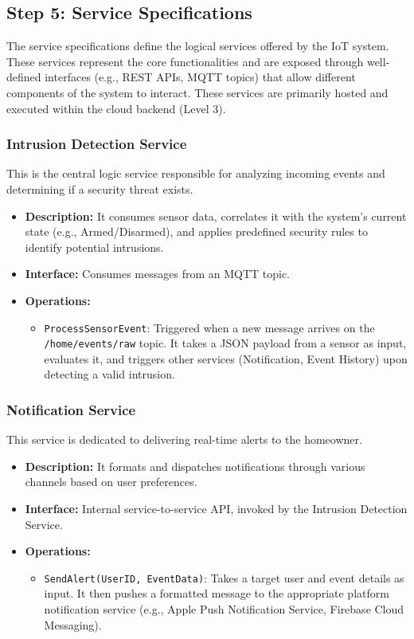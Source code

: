 \documentclass[conference]{IEEEtran}
\begin{document}
\subsection{Step 5: Service Specifications}
The service specifications define the logical services offered by the IoT system. These services represent the core functionalities and are exposed through well-defined interfaces (e.g., REST APIs, MQTT topics) that allow different components of the system to interact. These services are primarily hosted and executed within the cloud backend (Level 3).

\subsubsection{Intrusion Detection Service}
This is the central logic service responsible for analyzing incoming events and determining if a security threat exists.
\begin{itemize}
    \item \textbf{Description:} It consumes sensor data, correlates it with the system's current state (e.g., Armed/Disarmed), and applies predefined security rules to identify potential intrusions.
    \item \textbf{Interface:} Consumes messages from an MQTT topic.
    \item \textbf{Operations:}
    \begin{itemize}
        \item \texttt{ProcessSensorEvent}: Triggered when a new message arrives on the \texttt{/home/events/raw} topic. It takes a JSON payload from a sensor as input, evaluates it, and triggers other services (Notification, Event History) upon detecting a valid intrusion.
    \end{itemize}
\end{itemize}

\subsubsection{Notification Service}
This service is dedicated to delivering real-time alerts to the homeowner.
\begin{itemize}
    \item \textbf{Description:} It formats and dispatches notifications through various channels based on user preferences.
    \item \textbf{Interface:} Internal service-to-service API, invoked by the Intrusion Detection Service.
    \item \textbf{Operations:}
    \begin{itemize}
        \item \texttt{SendAlert(UserID, EventData)}: Takes a target user and event details as input. It then pushes a formatted message to the appropriate platform notification service (e.g., Apple Push Notification Service, Firebase Cloud Messaging).
    \end{itemize}
\end{itemize}
\end{document}
